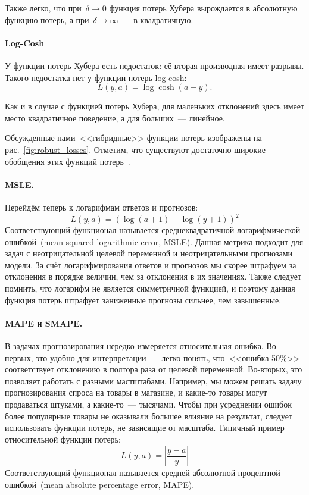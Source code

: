 \documentclass[12pt,fleqn]{article}
\begin{document}
Также легко, что при~$\delta \to 0$ функция потерь Хубера вырождается в абсолютную функцию потерь,
а при~$\delta \to \infty$~--- в квадратичную.

\paragraph{Log-Cosh}

У функции потерь Хубера есть недостаток: её вторая производная имеет разрывы.
Такого недостатка нет у функции потерь log-cosh:
\[
    L(y, a)
    =
    \log \cosh(a - y).
\]

Как и в случае с функцией потерь Хубера, для маленьких отклонений здесь имеет место
квадратичное поведение, а для больших~--- линейное.

Обсужденные нами~<<гибридные>> функции потерь изображены на рис.~\ref{fig:robust_losses}.
Отметим, что существуют достаточно широкие обобщения этих функций потерь~\cite{barron19robust}.

\paragraph{MSLE.}

Перейдём теперь к логарифмам ответов и прогнозов:
\[
    L(y, a) = (\log(a + 1) - \log(y + 1))^2
\]
Соответствующий функционал называется среднеквадратичной логарифмической ошибкой~(mean
squared logarithmic error, MSLE).
Данная метрика подходит для задач с неотрицательной целевой переменной и неотрицательными прогнозами модели.
За счёт логарифмирования ответов и прогнозов мы скорее штрафуем за отклонения
в порядке величин, чем за отклонения в их значениях.
Также следует помнить, что логарифм не является симметричной функцией,
и поэтому данная функция потерь штрафует заниженные прогнозы сильнее,
чем завышенные.

\paragraph{MAPE и SMAPE.}

В задачах прогнозирования нередко измеряется относительная ошибка.
Во-первых, это удобно для интерпретации~--- легко понять, что~<<ошибка 50\%>>
соответствует отклонению в полтора раза от целевой переменной.
Во-вторых, это позволяет работать с разными мастштабами.
Например, мы можем решать задачу прогнозирования спроса на товары в магазине,
и какие-то товары могут продаваться штуками, а какие-то~--- тысячами.
Чтобы при усреднении ошибок более популярные товары не оказывали
большее влияние на результат, следует использовать функции потерь, не зависящие от масштаба.
Типичный пример относительной функции потерь:
\[
    L(y, a) = \left| \frac{y - a}{y} \right|
\]
Соответствующий функционал называется средней абсолютной процентной ошибкой~(mean
absolute percentage error, MAPE).
\end{document}
